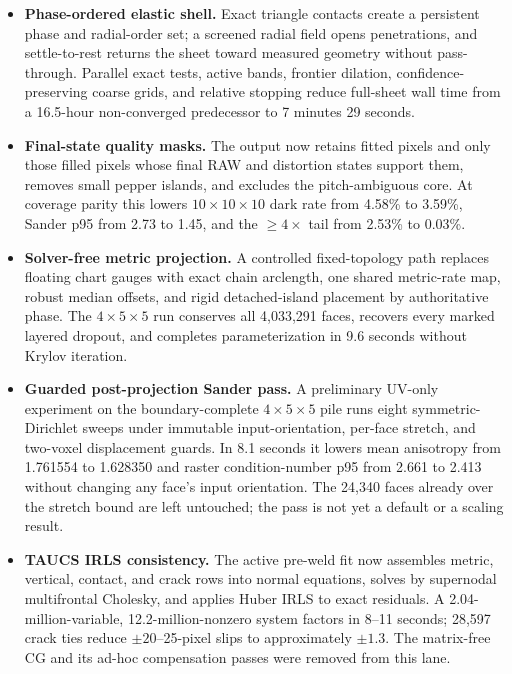 \begin{revision}
{\begin{itemize}
  \item \textbf{Phase-ordered elastic shell.} Exact triangle contacts create a persistent phase and radial-order set; a screened radial field opens penetrations, and settle-to-rest returns the sheet toward measured geometry without pass-through. Parallel exact tests, active bands, frontier dilation, confidence-preserving coarse grids, and relative stopping reduce full-sheet wall time from a 16.5-hour non-converged predecessor to 7 minutes 29 seconds.

  \item \textbf{Final-state quality masks.} The output now retains fitted pixels and only those filled pixels whose final RAW and distortion states support them, removes small pepper islands, and excludes the pitch-ambiguous core. At coverage parity this lowers $10\times10\times10$ dark rate from 4.58\% to 3.59\%, Sander p95 from 2.73 to 1.45, and the $\ge4\times$ tail from 2.53\% to 0.03\%.

  \item \textbf{Solver-free metric projection.} A controlled fixed-topology path replaces floating chart gauges with exact chain arclength, one shared metric-rate map, robust median offsets, and rigid detached-island placement by authoritative phase. The $4\times5\times5$ run conserves all 4,033,291 faces, recovers every marked layered dropout, and completes parameterization in 9.6 seconds without Krylov iteration.

  \item \textbf{Guarded post-projection Sander pass.} A preliminary UV-only experiment on the boundary-complete $4\times5\times5$ pile runs eight symmetric-Dirichlet sweeps under immutable input-orientation, per-face stretch, and two-voxel displacement guards. In 8.1 seconds it lowers mean anisotropy from 1.761554 to 1.628350 and raster condition-number p95 from 2.661 to 2.413 without changing any face's input orientation. The 24,340 faces already over the stretch bound are left untouched; the pass is not yet a default or a scaling result.

  \item \textbf{TAUCS IRLS consistency.} The active pre-weld fit now assembles metric, vertical, contact, and crack rows into normal equations, solves by supernodal multifrontal Cholesky, and applies Huber IRLS to exact residuals. A 2.04-million-variable, 12.2-million-nonzero system factors in 8--11 seconds; 28,597 crack ties reduce $\pm20$--25-pixel slips to approximately $\pm1.3$. The matrix-free CG and its ad-hoc compensation passes were removed from this lane.


\end{itemize}}
\end{revision}
